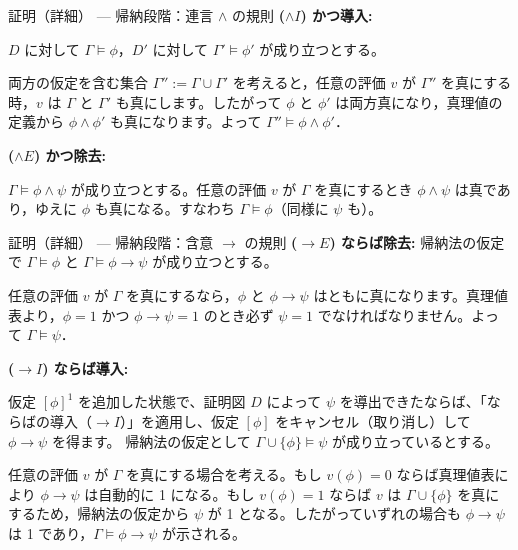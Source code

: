 \documentclass[unicode,10pt]{beamer}
\begin{document}
\begin{frame}{証明（詳細） — 帰納段階：連言 $\land$ の規則}
    \textbf{($\land I$) かつ導入:}
    
    $D$ に対して $\Gamma \models \phi$，$D'$ に対して $\Gamma' \models \phi'$ が成り立つとする。

    両方の仮定を含む集合 $\Gamma'':=\Gamma\cup\Gamma'$ を考えると，任意の評価 $v$ が $\Gamma''$ を真にする時，$v$ は $\Gamma$ と $\Gamma'$ も真にします。したがって $\phi$ と $\phi'$ は両方真になり，真理値の定義から $\phi\land\phi'$ も真になります。よって $\Gamma''\models\phi\land\phi'$．

    \textbf{($\land E$) かつ除去:}
    
    $\Gamma\models\phi\land\psi$ が成り立つとする。任意の評価 $v$ が $\Gamma$ を真にするとき $\phi\land\psi$ は真であり，ゆえに $\phi$ も真になる。すなわち $\Gamma\models\phi$（同様に $\psi$ も）。
\end{frame}

\begin{frame}{証明（詳細） — 帰納段階：含意 $\to$ の規則}
    \textbf{($\to E$) ならば除去:}
    帰納法の仮定で $\Gamma\models\phi$ と $\Gamma\models\phi\to\psi$ が成り立つとする。

    任意の評価 $v$ が $\Gamma$ を真にするなら，$\phi$ と $\phi\to\psi$ はともに真になります。真理値表より，$\phi=1$ かつ $\phi\to\psi=1$ のとき必ず $\psi=1$ でなければなりません。よって $\Gamma\models\psi$．

    \textbf{($\to I$) ならば導入:}
    
    仮定 $[\phi]^1$ を追加した状態で、証明図 $D$ によって $\psi$ を導出できたならば、「ならばの導入（$\to I$）」を適用し、仮定 $[\phi]$ をキャンセル（取り消し）して $\phi\to\psi$ を得ます。
    帰納法の仮定として $\Gamma\cup\{\phi\}\models\psi$ が成り立っているとする。

    任意の評価 $v$ が $\Gamma$ を真にする場合を考える。もし $v(\phi)=0$ ならば真理値表により $\phi\to\psi$ は自動的に 1 になる。もし $v(\phi)=1$ ならば $v$ は $\Gamma\cup\{\phi\}$ を真にするため，帰納法の仮定から $\psi$ が 1 となる。したがっていずれの場合も $\phi\to\psi$ は 1 であり，$\Gamma\models\phi\to\psi$ が示される。
\end{frame}
\end{document}
